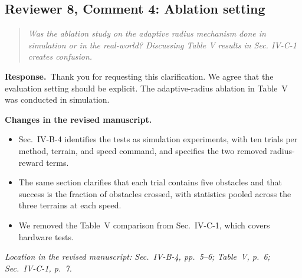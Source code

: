 \documentclass[11pt]{article}
\newenvironment{reviewcomment}{\begin{quote}\color{reviewblue}\itshape}{\end{quote}}
\newcommand{\Response}{\par\noindent\textbf{Response.}\ }
\newcommand{\Changes}{\par\noindent\textbf{Changes in the revised manuscript.}\ }
\newcommand{\Location}[1]{\par\noindent\textit{Location in the revised manuscript: #1}}
\begin{document}
\subsection*{Reviewer 8, Comment 4: Ablation setting}
\begin{reviewcomment}
Was the ablation study on the adaptive radius mechanism done in simulation or in the real-world? Discussing Table V results in Sec. IV-C-1 creates confusion.
\end{reviewcomment}
\Response Thank you for requesting this clarification. We agree that the evaluation setting should be explicit. The adaptive-radius ablation in Table~V was conducted in simulation.
\Changes
\begin{itemize}
    \item Sec.~IV-B-4 identifies the tests as simulation experiments, with ten trials per method, terrain, and speed command, and specifies the two removed radius-reward terms.
    \item The same section clarifies that each trial contains five obstacles and that success is the fraction of obstacles crossed, with statistics pooled across the three terrains at each speed.
    \item We removed the Table~V comparison from Sec.~IV-C-1, which covers hardware tests.
\end{itemize}
\Location{Sec.~IV-B-4, pp.~5--6; Table~V, p.~6; Sec.~IV-C-1, p.~7.}
\end{document}
